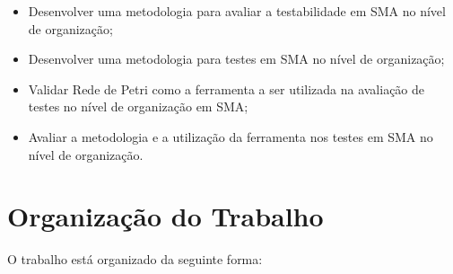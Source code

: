 \begin{itemize}

% 
% 
% 
\item Desenvolver uma metodologia para avaliar a testabilidade em SMA no nível de organização;
\item Desenvolver uma metodologia para testes em SMA no nível de organização;
\item Validar Rede de Petri como a ferramenta a ser utilizada na avaliação de testes no nível de organização em SMA;
% 
% 
\item Avaliar a metodologia e a utilização da ferramenta nos testes em SMA no nível de organização.


\end{itemize}


\section{Organização do Trabalho}

O trabalho está organizado da seguinte forma:

